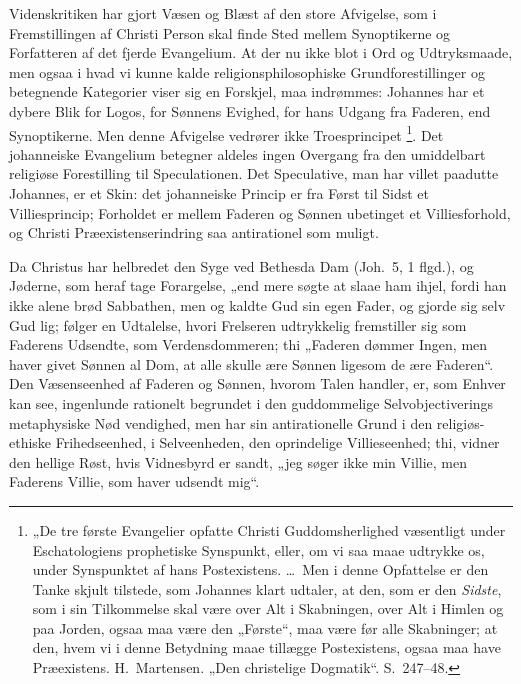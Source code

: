 \documentclass[12pt]{book}
\begin{document}
Videnskritiken har gjort Væsen og Blæst af den store Afvigelse, som i
Fremstillingen af Christi Person skal finde Sted mellem Synoptikerne
og Forfatteren af det fjerde Evangelium. At der nu ikke blot i Ord og
Udtryksmaade, men ogsaa i hvad vi kunne kalde religionsphilosophiske
Grundforestillinger og betegnende Kategorier viser sig en Forskjel,
maa indrømmes: Johannes har et dybere Blik for Logos, for Sønnens
Evighed, for hans Udgang fra Faderen, end Synoptikerne. Men denne
Afvigelse vedrører ikke Troesprincipet%
\footnote{„De tre første Evangelier opfatte Christi Guddomsherlighed
væsentligt under Eschatologiens prophetiske Synspunkt, eller, om vi
saa maae udtrykke os, under Synspunktet af hans Postexistens. \dots\
Men i denne Opfattelse er den Tanke skjult tilstede, som Johannes
klart udtaler, at den, som er den \emph{Sidste}, som i sin
Tilkommelse skal være over Alt i Skabningen, over Alt i Himlen og paa
Jorden, ogsaa maa være den „Første“, maa være før alle Skabninger; at
den, hvem vi i denne Betydning maae tillægge Postexistens, ogsaa maa
have Præexistens. H.\ Martensen. „Den christelige Dogmatik“.
S.\ 247--48.}. Det johanneiske Evangelium betegner aldeles ingen
Overgang fra den umiddelbart religiøse Forestilling til
Speculationen. Det Speculative, man har villet paadutte Johannes, er
et Skin: det johanneiske Princip er fra Først til Sidst et
Villiesprincip; Forholdet er mellem Faderen og Sønnen ubetinget et
Villiesforhold, og Christi Præexistenserindring saa antirationel som
muligt.

Da Christus har helbredet den Syge ved Bethesda Dam (Joh.\ 5, 1
flgd.), og Jøderne, som heraf tage Forargelse,
„end mere søgte at slaae ham ihjel, fordi han ikke alene brød
Sabbathen, men og kaldte Gud sin egen Fader, og gjorde sig selv Gud
lig; følger en Udtalelse, hvori Frelseren udtrykkelig fremstiller sig
som Faderens Udsendte, som Verdensdommeren; thi „Faderen dømmer
Ingen, men haver givet Sønnen al Dom, at alle skulle ære Sønnen
ligesom de ære Faderen“. Den Væsenseenhed af Faderen og Sønnen,
hvorom Talen handler, er, som Enhver kan see, ingenlunde rationelt
begrundet i den guddommelige Selvobjectiverings metaphysiske Nød\-
vendighed, men har sin antirationelle Grund i den religiøs-ethiske
Frihedseenhed, i Selveenheden, den oprindelige Villieseenhed; thi,
vidner den hellige Røst, hvis Vidnesbyrd er sandt, „jeg søger ikke
min Villie, men Faderens Villie, som haver udsendt mig“.
\end{document}
